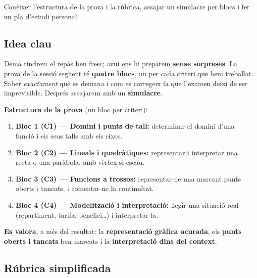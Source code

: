 %
{Conèixer l'estructura de la prova i la rúbrica, assajar un simulacre per blocs i fer un pla d'estudi personal.}

\subsection{Idea clau}

Demà tindrem el repàs ben fresc; avui ens hi preparem \textbf{sense sorpreses}. La
prova de la sessió següent té \textbf{quatre blocs}, un per cada criteri que hem
treballat. Saber \emph{exactament} què es demana i com es corregeix fa que l'examen
deixi de ser imprevisible. Després assajarem amb un \textbf{simulacre}.

\begin{idea}
\textbf{Estructura de la prova} (un bloc per criteri):
\begin{enumerate}[leftmargin=1.6em, itemsep=2pt]
  \item \textbf{Bloc 1 (C1) — Domini i punts de tall:} determinar el domini d'una
        funció i els seus talls amb els eixos.
  \item \textbf{Bloc 2 (C2) — Lineals i quadràtiques:} representar i interpretar una
        recta o una paràbola, amb vèrtex si escau.
  \item \textbf{Bloc 3 (C3) — Funcions a trossos:} representar-ne una marcant punts
        oberts i tancats, i comentar-ne la continuïtat.
  \item \textbf{Bloc 4 (C4) — Modelització i interpretació:} llegir una situació real
        (repartiment, tarifa, benefici\dots) i interpretar-la.
\end{enumerate}
\textbf{Es valora}, a més del resultat: la \textbf{representació gràfica acurada},
els \textbf{punts oberts i tancats} ben marcats i la \textbf{interpretació dins del
context}.
\end{idea}

\subsection{Rúbrica simplificada}


